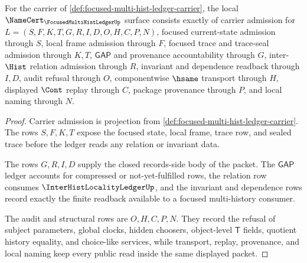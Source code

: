 \begin{theorem}
\label{thm:focused-multi-hist-ledger-namecert-obligations}
For the carrier of \autoref{def:focused-multi-hist-ledger-carrier}, the local $\NameCert_{\FocusedMultiHistLedgerUp}$ surface consists exactly of carrier admission for $L=(S,F,K,T,G,R,I,D,O,H,C,P,N)$, focused current-state admission through $S$, local frame admission through $F$, focused trace and trace-seal admission through $K,T$, $\mathsf{GAP}$ and provenance accountability through $G$, inter-$\Hist$ relation admission through $R$, invariant and dependence readback through $I,D$, audit refusal through $O$, componentwise $\hsame$ transport through $H$, displayed $\Cont$ replay through $C$, package provenance through $P$, and local naming through $N$.
\end{theorem}
\begin{proof}
Carrier admission is projection from \autoref{def:focused-multi-hist-ledger-carrier}. The rows $S,F,K,T$ expose the focused state, local frame, trace row, and sealed trace before the ledger reads any relation or invariant data.

The rows $G,R,I,D$ supply the closed records-side body of the packet. The $\mathsf{GAP}$ ledger accounts for compressed or not-yet-fulfilled rows, the relation row consumes $\InterHistLocalityLedgerUp$, and the invariant and dependence rows record exactly the finite readback available to a focused multi-history consumer.

The audit and structural rows are $O,H,C,P,N$. They record the refusal of subject parameters, global clocks, hidden choosers, object-level $\mathsf{T}$ fields, quotient history equality, and choice-like services, while transport, replay, provenance, and local naming keep every public read inside the same displayed packet.
\end{proof}

